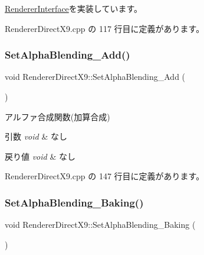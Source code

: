 \mbox{\hyperlink{class_renderer_interface_aa9e12d2a2f5ffa351c457cfc7806b6f1}{Renderer\+Interface}}を実装しています。



 Renderer\+Direct\+X9.\+cpp の 117 行目に定義があります。

\mbox{\label{class_renderer_direct_x9_aa552107a3d5f8a61347fe10741fd04a3}} 
\subsubsection{\texorpdfstring{Set\+Alpha\+Blending\+\_\+\+Add()}{SetAlphaBlending\_Add()}}
{\footnotesize\ttfamily void Renderer\+Direct\+X9\+::\+Set\+Alpha\+Blending\+\_\+\+Add (\begin{DoxyParamCaption}{ }\end{DoxyParamCaption})}



アルファ合成関数(加算合成) 


\begin{DoxyParams}{引数}
{\em void} & なし \\
\hline
\end{DoxyParams}

\begin{DoxyRetVals}{戻り値}
{\em void} & なし \\
\hline
\end{DoxyRetVals}


 Renderer\+Direct\+X9.\+cpp の 147 行目に定義があります。

\mbox{\label{class_renderer_direct_x9_a083f55d941075227189769fd9807ffd1}} 
\subsubsection{\texorpdfstring{Set\+Alpha\+Blending\+\_\+\+Baking()}{SetAlphaBlending\_Baking()}}
{\footnotesize\ttfamily void Renderer\+Direct\+X9\+::\+Set\+Alpha\+Blending\+\_\+\+Baking (\begin{DoxyParamCaption}{ }\end{DoxyParamCaption})}



